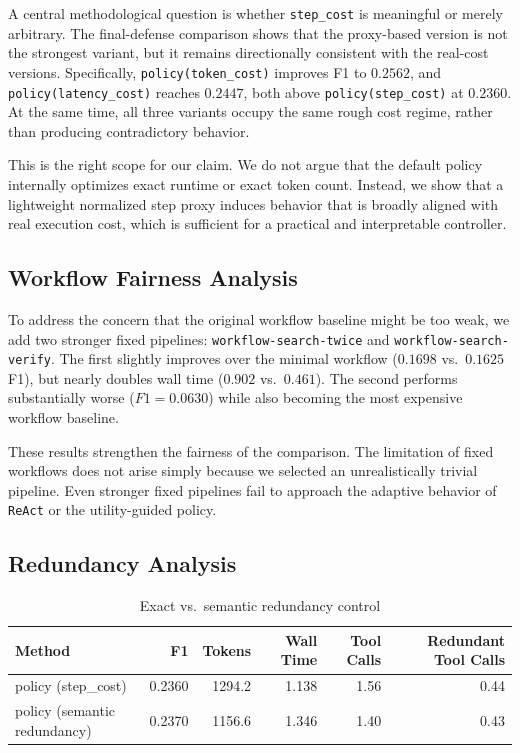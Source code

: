 A central methodological question is whether \texttt{step\_cost} is meaningful or merely arbitrary. The final-defense comparison shows that the proxy-based version is not the strongest variant, but it remains directionally consistent with the real-cost versions. Specifically, \texttt{policy(token\_cost)} improves F1 to $0.2562$, and \texttt{policy(latency\_cost)} reaches $0.2447$, both above \texttt{policy(step\_cost)} at $0.2360$. At the same time, all three variants occupy the same rough cost regime, rather than producing contradictory behavior.

This is the right scope for our claim. We do not argue that the default policy internally optimizes exact runtime or exact token count. Instead, we show that a lightweight normalized step proxy induces behavior that is broadly aligned with real execution cost, which is sufficient for a practical and interpretable controller.

\subsection{Workflow Fairness Analysis}



To address the concern that the original workflow baseline might be too weak, we add two stronger fixed pipelines: \texttt{workflow-search-twice} and \texttt{workflow-search-verify}. The first slightly improves over the minimal workflow ($0.1698$ vs.\ $0.1625$ F1), but nearly doubles wall time ($0.902$ vs.\ $0.461$). The second performs substantially worse ($F1=0.0630$) while also becoming the most expensive workflow baseline.

These results strengthen the fairness of the comparison. The limitation of fixed workflows does not arise simply because we selected an unrealistically trivial pipeline. Even stronger fixed pipelines fail to approach the adaptive behavior of \texttt{ReAct} or the utility-guided policy.

\subsection{Redundancy Analysis}

\begin{table}[t]
\centering
\small
\caption{Exact vs.\ semantic redundancy control}
\begin{tabular}{lrrrrr}
\hline
Method & F1 & Tokens & Wall Time & Tool Calls & Redundant Tool Calls \\
\hline
policy (step\_cost) & 0.2360 & 1294.2 & 1.138 & 1.56 & 0.44 \\
policy (semantic redundancy) & 0.2370 & 1156.6 & 1.346 & 1.40 & 0.43 \\
\hline
\end{tabular}
\end{table}

